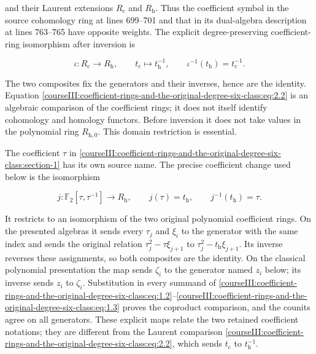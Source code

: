 and their Laurent extensions \(R_{\mathrm c}\) and \(R_{\mathrm h}\). Thus the coefficient symbol in the source cohomology ring at lines 699--701 and that in its dual-algebra description at lines 763--765 have opposite weights. The explicit degree-preserving coefficient-ring isomorphism after inversion is

\begin{equation}
\iota:R_{\mathrm c}\longrightarrow R_{\mathrm h},
 \qquad t_{\mathrm c}\longmapsto t_{\mathrm h}^{-1},
 \qquad
 \iota^{-1}(t_{\mathrm h})=t_{\mathrm c}^{-1}.
 \label{courseIII:coefficient-rings-and-the-original-degree-six-class:eq:2.2}
\end{equation}

The two composites fix the generators and their inverses, hence are the identity. Equation \eqref{courseIII:coefficient-rings-and-the-original-degree-six-class:eq:2.2} is an algebraic comparison of the coefficient rings; it does not itself identify cohomology and homology functors. Before inversion it does not take values in the polynomial ring \(R_{\mathrm h,0}\). This domain restriction is essential.

The coefficient \(\tau\) in \cref{courseIII:coefficient-rings-and-the-original-degree-six-class:section-1} has its own source name. The precise coefficient change used below is the isomorphism

\begin{equation}
j:\mathbb F_2[\tau,\tau^{-1}]\longrightarrow R_{\mathrm h},
 \qquad j(\tau)=t_{\mathrm h},\qquad j^{-1}(t_{\mathrm h})=\tau.
 \label{courseIII:coefficient-rings-and-the-original-degree-six-class:eq:2.3}
\end{equation}

It restricts to an isomorphism of the two original polynomial coefficient rings. On the presented algebras it sends every \(\tau_j\) and \(\xi_i\) to the generator with the same index and sends the original relation \(\tau_j^2-\tau\xi_{j+1}\) to \(\tau_j^2-t_{\mathrm h}\xi_{j+1}\). Its inverse reverses these assignments, so both composites are the identity. On the classical polynomial presentation the map sends \(\zeta_i\) to the generator named \(z_i\) below; its inverse sends \(z_i\) to \(\zeta_i\). Substitution in every summand of \eqref{courseIII:coefficient-rings-and-the-original-degree-six-class:eq:1.2}--\eqref{courseIII:coefficient-rings-and-the-original-degree-six-class:eq:1.3} proves the coproduct comparison, and the counits agree on all generators. These explicit maps relate the two retained coefficient notations; they are different from the Laurent comparison \eqref{courseIII:coefficient-rings-and-the-original-degree-six-class:eq:2.2}, which sends \(t_{\mathrm c}\) to \(t_{\mathrm h}^{-1}\).

